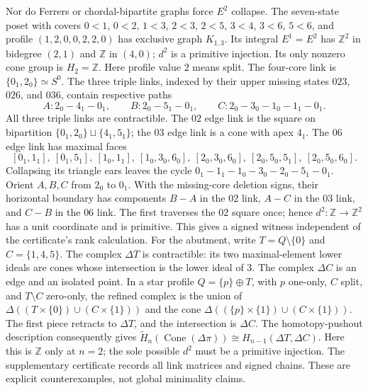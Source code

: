 \documentclass[11pt]{article}
\newcommand{\Cone}{\operatorname{Cone}}
\begin{document}
Nor do Ferrers or chordal-bipartite graphs force $E^2$ collapse.
The seven-state poset with covers
$0<1$, $0<2$, $1<3$, $2<3$, $2<5$, $3<4$, $3<6$, $5<6$,
and profile $(1,2,0,0,2,2,0)$ has exclusive graph $K_{1,3}$.
Its integral $E^1=E^2$ has $\mathbb Z^2$ in bidegree $(2,1)$
and $\mathbb Z$ in $(4,0)$; $d^2$ is a primitive injection.
Its only nonzero cone group is $H_2=\mathbb Z$.
Here profile value $2$ means split.  The four-core link is
$\{0_1,2_0\}\simeq S^0$.  The three triple links, indexed by their
upper missing states $023$, $026$, and $036$, contain respective paths
\[
 A:2_0-4_1-0_1,\qquad B:2_0-5_1-0_1,\qquad
 C:2_0-3_0-1_0-1_1-0_1.
\]
All three triple links are contractible.  The $02$ edge link is the square
on bipartition $\{0_1,2_0\}\sqcup\{4_1,5_1\}$; the $03$ edge link is a
cone with apex $4_1$.  The $06$ edge link has maximal faces
\[
 [0_1,1_1],\ [0_1,5_1],\ [1_0,1_1],\
 [1_0,3_0,6_0],\ [2_0,3_0,6_0],\
 [2_0,5_0,5_1],\ [2_0,5_0,6_0].
\]
Collapsing its triangle ears leaves the cycle
$0_1-1_1-1_0-3_0-2_0-5_1-0_1$.
Orient $A,B,C$ from $2_0$ to $0_1$.  With the missing-core deletion
signs, their horizontal boundary has components $B-A$ in the $02$ link,
$A-C$ in the $03$ link, and $C-B$ in the $06$ link.  The first traverses
the $02$ square once; hence $d^2:\mathbb Z\to\mathbb Z^2$ has a unit
coordinate and is primitive.  This gives a signed witness independent of
the certificate's rank calculation.
For the abutment, write $T=Q\setminus\{0\}$ and $C=\{1,4,5\}$.
The complex $\Delta T$ is contractible: its two maximal-element lower ideals
are cones whose intersection is the lower ideal of $3$.
The complex $\Delta C$ is an edge and an isolated point.
In a star profile $Q=\{p\}\oplus T$, with $p$ one-only, $C$ split, and
$T\setminus C$ zero-only, the refined complex is the union of
$\Delta((T\times\{0\})\cup(C\times\{1\}))$ and the cone
$\Delta((\{p\}\times\{1\})\cup(C\times\{1\}))$.
The first piece retracts to $\Delta T$, and the intersection is $\Delta C$.
The homotopy-pushout description consequently gives
$\widetilde H_n(\Cone(\Delta\pi))\cong H_{n-1}(\Delta T,\Delta C)$.
Here this is $\mathbb Z$ only at $n=2$; the sole possible $d^2$ must be a
primitive injection.  The supplementary certificate records all link matrices
and signed chains.  These are explicit counterexamples, not global minimality claims.
\end{document}

